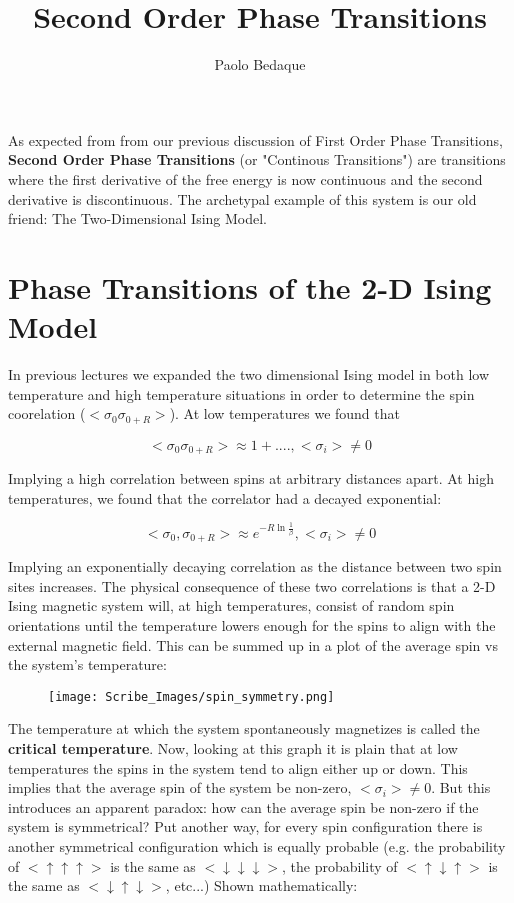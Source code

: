 \documentclass{article}
\title{Second Order Phase Transitions}
\author{Paolo Bedaque}
\begin{document}
\maketitle

As expected from from our previous discussion of First Order Phase Transitions, \textbf{Second Order Phase Transitions} (or "Continous Transitions") are transitions where the first derivative of the free energy is now continuous and the second derivative is discontinuous.  The archetypal example of this system is our old friend: The Two-Dimensional Ising Model.

\section{Phase Transitions of the 2-D Ising Model}

In previous lectures we expanded the two dimensional Ising model in both low temperature and high temperature situations in order to determine the spin coorelation ($<\sigma_{0}\sigma_{0+R}>$).  At low temperatures we found that

$$<\sigma_{0}\sigma_{0+R}>\approx1+...., <\sigma_{i}>\neq0$$

Implying a high correlation between spins at arbitrary distances apart.  At high temperatures, we found that the correlator had a decayed exponential:

$$<\sigma_{0},\sigma_{0+R}>\approx e^{-R\ln{\frac{1}{\beta}}}, <\sigma_{i}>\neq0$$

Implying an exponentially decaying correlation as the distance between two spin sites increases.  The physical consequence of these two correlations is that a 2-D Ising magnetic system will, at high temperatures, consist of random spin orientations until the temperature lowers enough for the spins to align with the external magnetic field.  This can be summed up in a plot of the average spin vs the system's temperature:

\begin{figure}
	\texttt{[image: Scribe\_Images/spin\_symmetry.png]}
\end{figure}

The temperature at which the system spontaneously magnetizes is called the \textbf{critical temperature}.  Now, looking at this graph it is plain that at low temperatures the spins in the system tend to align either up or down.  This implies that the average spin of the system be non-zero, $<\sigma_{i}>\neq0$.  But this introduces an apparent paradox: how can the average spin be non-zero if the system is symmetrical?  Put another way, for every spin configuration there is another symmetrical configuration which is equally probable (e.g. the probability of $<\uparrow\uparrow\uparrow>$ is the same as $<\downarrow\downarrow\downarrow>$, the probability of $<\uparrow\downarrow\uparrow>$ is the same as $<\downarrow\uparrow\downarrow>$, etc...)  Shown mathematically:
\end{document}

